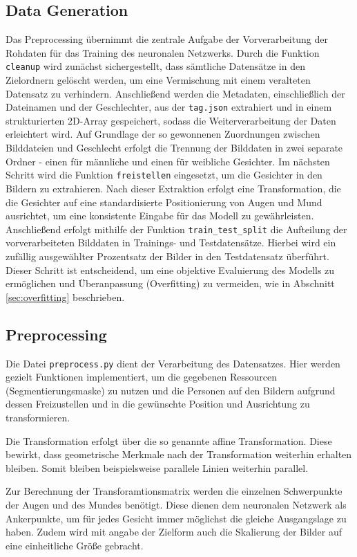 \documentclass[journal,twoside,web]{ieeecolor}
\begin{document}
\subsection{Data Generation}
Das Preprocessing übernimmt die zentrale Aufgabe der Vorverarbeitung der Rohdaten für das Training des neuronalen Netzwerks.
Durch die Funktion \texttt{cleanup} wird zunächst sichergestellt, dass sämtliche Datensätze in den Zielordnern gelöscht werden, um eine Vermischung mit einem veralteten Datensatz zu verhindern.
Anschließend werden die Metadaten, einschließlich der Dateinamen und der Geschlechter, aus der \texttt{tag.json} extrahiert und in einem strukturierten 2D-Array gespeichert, sodass die Weiterverarbeitung der Daten erleichtert wird.
Auf Grundlage der so gewonnenen Zuordnungen zwischen Bilddateien und Geschlecht erfolgt die Trennung der Bilddaten in zwei separate Ordner - einen für männliche und einen für weibliche Gesichter.
Im nächsten Schritt wird die Funktion \texttt{freistellen} eingesetzt, um die Gesichter in den Bildern zu extrahieren.
Nach dieser Extraktion erfolgt eine Transformation, die die Gesichter auf eine standardisierte Positionierung von Augen und Mund ausrichtet, um eine konsistente Eingabe für das Modell zu gewährleisten.
Anschließend erfolgt mithilfe der Funktion \texttt{train\_test\_split} die Aufteilung der vorverarbeiteten Bilddaten in Trainings- und Testdatensätze.
Hierbei wird ein zufällig ausgewählter Prozentsatz der Bilder in den Testdatensatz überführt.
Dieser Schritt ist entscheidend, um eine objektive Evaluierung des Modells zu ermöglichen und Überanpassung (Overfitting) zu vermeiden, wie in Abschnitt \ref{sec:overfitting} beschrieben.

\subsection{Preprocessing}

Die Datei \texttt{preprocess.py} dient der Verarbeitung des Datensatzes. Hier werden gezielt Funktionen implementiert, um die gegebenen Ressourcen (Segmentierungsmaske) zu nutzen und die Personen auf den Bildern aufgrund dessen Freizustellen und in die gewünschte Position und Ausrichtung zu transformieren. 

Die Transformation erfolgt über die so genannte affine Transformation. Diese bewirkt, dass geometrische Merkmale nach der Transformation weiterhin erhalten bleiben. Somit bleiben beispielsweise parallele Linien weiterhin parallel.

Zur Berechnung der Transforamtionsmatrix werden die einzelnen Schwerpunkte der Augen und des Mundes benötigt. Diese dienen dem neuronalen Netzwerk als Ankerpunkte, um für jedes Gesicht immer möglichst die gleiche Ausgangslage zu haben. Zudem wird mit angabe der Zielform auch die Skalierung der Bilder auf eine einheitliche Größe gebracht.
\end{document}
